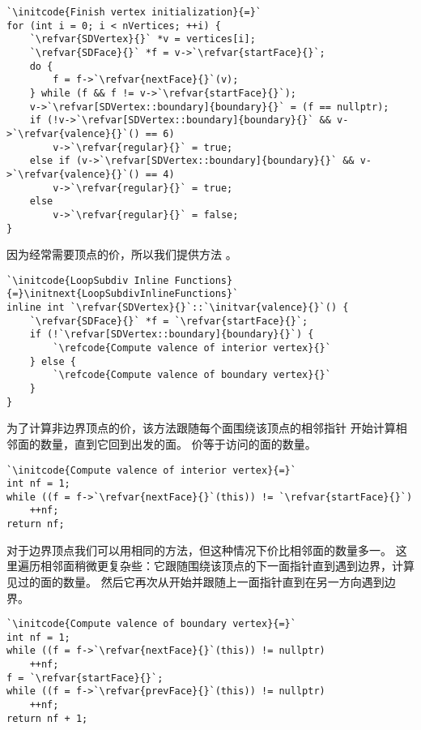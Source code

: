 \begin{lstlisting}
`\initcode{Finish vertex initialization}{=}`
for (int i = 0; i < nVertices; ++i) {
    `\refvar{SDVertex}{}` *v = vertices[i];
    `\refvar{SDFace}{}` *f = v->`\refvar{startFace}{}`;
    do {
        f = f->`\refvar{nextFace}{}`(v);
    } while (f && f != v->`\refvar{startFace}{}`);
    v->`\refvar[SDVertex::boundary]{boundary}{}` = (f == nullptr);
    if (!v->`\refvar[SDVertex::boundary]{boundary}{}` && v->`\refvar{valence}{}`() == 6)
        v->`\refvar{regular}{}` = true;
    else if (v->`\refvar[SDVertex::boundary]{boundary}{}` && v->`\refvar{valence}{}`() == 4)
        v->`\refvar{regular}{}` = true;
    else
        v->`\refvar{regular}{}` = false;
}
\end{lstlisting}

因为经常需要顶点的价，所以我们提供方法
。
\begin{lstlisting}
`\initcode{LoopSubdiv Inline Functions}{=}\initnext{LoopSubdivInlineFunctions}`
inline int `\refvar{SDVertex}{}`::`\initvar{valence}{}`() {
    `\refvar{SDFace}{}` *f = `\refvar{startFace}{}`;
    if (!`\refvar[SDVertex::boundary]{boundary}{}`) {
        `\refcode{Compute valence of interior vertex}{}`
    } else {
        `\refcode{Compute valence of boundary vertex}{}`
    }
}
\end{lstlisting}

为了计算非边界顶点的价，该方法跟随每个面围绕该顶点的相邻指针
开始计算相邻面的数量，直到它回到出发的面。
价等于访问的面的数量。
\begin{lstlisting}
`\initcode{Compute valence of interior vertex}{=}`
int nf = 1;
while ((f = f->`\refvar{nextFace}{}`(this)) != `\refvar{startFace}{}`)
    ++nf;
return nf;
\end{lstlisting}

对于边界顶点我们可以用相同的方法，但这种情况下价比相邻面的数量多一。
这里遍历相邻面稍微更复杂些：它跟随围绕该顶点的下一面指针直到遇到边界，计算见过的面的数量。
然后它再次从开始并跟随上一面指针直到在另一方向遇到边界。
\begin{lstlisting}
`\initcode{Compute valence of boundary vertex}{=}`
int nf = 1;
while ((f = f->`\refvar{nextFace}{}`(this)) != nullptr)
    ++nf;
f = `\refvar{startFace}{}`;
while ((f = f->`\refvar{prevFace}{}`(this)) != nullptr)
    ++nf;
return nf + 1;
\end{lstlisting}


